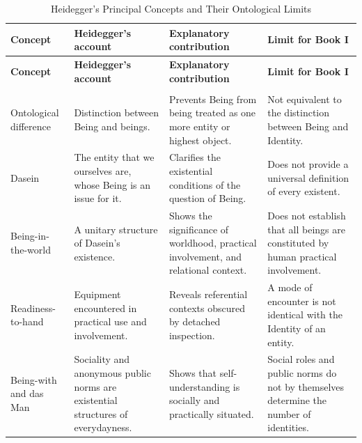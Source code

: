 \begin{longtable}{
    >{\raggedright\arraybackslash}p{2.15cm}
    >{\raggedright\arraybackslash}p{}
    >{\raggedright\arraybackslash}p{}
    >{\raggedright\arraybackslash}p{}
}

\caption{Heidegger's Principal Concepts and Their Ontological Limits}
\label{tab:VS.B01.P01.C08.S11.SS14.P003.TL01} \\

\toprule
\textbf{Concept}
&
\textbf{Heidegger's account}
&
\textbf{Explanatory contribution}
&
\textbf{Limit for Book I}
\\
\midrule
\endfirsthead

\toprule
\textbf{Concept}
&
\textbf{Heidegger's account}
&
\textbf{Explanatory contribution}
&
\textbf{Limit for Book I}
\\
\midrule
\endhead

\midrule
\multicolumn{4}{r}{\footnotesize\textit{Continued on next page}}\\
\endfoot

\bottomrule
\endlastfoot

Ontological difference
&
Distinction between Being and beings.
&
Prevents Being from being treated as one
more entity or highest object.
&
Not equivalent to the distinction between
Being and Identity.
\\

\addlinespace

Dasein
&
The entity that we ourselves are, whose
Being is an issue for it.
&
Clarifies the existential conditions of
the question of Being.
&
Does not provide a universal definition
of every existent.
\\

\addlinespace

Being-in-the-world
&
A unitary structure of Dasein's existence.
&
Shows the significance of worldhood,
practical involvement, and relational context.
&
Does not establish that all beings are
constituted by human practical involvement.
\\

\addlinespace

Readiness-to-hand
&
Equipment encountered in practical use
and involvement.
&
Reveals referential contexts obscured
by detached inspection.
&
A mode of encounter is not identical
with the Identity of an entity.
\\

\addlinespace

Being-with and das Man
&
Sociality and anonymous public norms
are existential structures of everydayness.
&
Shows that self-understanding is socially
and practically situated.
&
Social roles and public norms do not
by themselves determine the number
of identities.
\\


\end{longtable}
